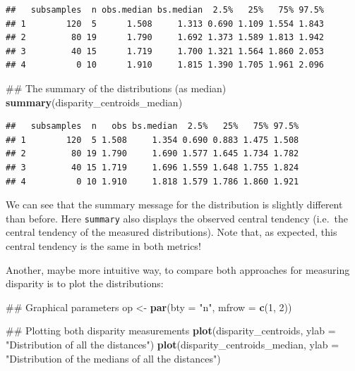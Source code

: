 \documentclass[]{book}
\newenvironment{Shaded}{\begin{snugshade}}{\end{snugshade}}
\newcommand{\KeywordTok}[1]{\textcolor[rgb]{0.13,0.29,0.53}{\textbf{#1}}}
\newcommand{\DataTypeTok}[1]{\textcolor[rgb]{0.13,0.29,0.53}{#1}}
\newcommand{\DecValTok}[1]{\textcolor[rgb]{0.00,0.00,0.81}{#1}}
\newcommand{\StringTok}[1]{\textcolor[rgb]{0.31,0.60,0.02}{#1}}
\newcommand{\NormalTok}[1]{#1}
\theoremstyle{definition}
\theoremstyle{definition}
\theoremstyle{remark}
\begin{document}
\begin{verbatim}
##   subsamples  n obs.median bs.median  2.5%   25%   75% 97.5%
## 1        120  5      1.508     1.313 0.690 1.109 1.554 1.843
## 2         80 19      1.790     1.692 1.373 1.589 1.813 1.942
## 3         40 15      1.719     1.700 1.321 1.564 1.860 2.053
## 4          0 10      1.910     1.815 1.390 1.705 1.961 2.096
\end{verbatim}

\begin{Shaded}
\begin{Highlighting}[]
\NormalTok{## The summary of the distributions (as median)}
\KeywordTok{summary}\NormalTok{(disparity_centroids_median)}
\end{Highlighting}
\end{Shaded}

\begin{verbatim}
##   subsamples  n   obs bs.median  2.5%   25%   75% 97.5%
## 1        120  5 1.508     1.354 0.690 0.883 1.475 1.508
## 2         80 19 1.790     1.690 1.577 1.645 1.734 1.782
## 3         40 15 1.719     1.696 1.559 1.648 1.755 1.824
## 4          0 10 1.910     1.818 1.579 1.786 1.860 1.921
\end{verbatim}

We can see that the summary message for the distribution is slightly
different than before. Here \texttt{summary} also displays the observed
central tendency (i.e.~the central tendency of the measured
distributions). Note that, as expected, this central tendency is the
same in both metrics!

Another, maybe more intuitive way, to compare both approaches for
measuring disparity is to plot the distributions:

\begin{Shaded}
\begin{Highlighting}[]
\NormalTok{## Graphical parameters}
\NormalTok{op <-}\StringTok{ }\KeywordTok{par}\NormalTok{(}\DataTypeTok{bty =} \StringTok{"n"}\NormalTok{, }\DataTypeTok{mfrow =} \KeywordTok{c}\NormalTok{(}\DecValTok{1}\NormalTok{, }\DecValTok{2}\NormalTok{))}

\NormalTok{## Plotting both disparity measurements}
\KeywordTok{plot}\NormalTok{(disparity_centroids, }\DataTypeTok{ylab =} \StringTok{"Distribution of all the distances"}\NormalTok{)}
\KeywordTok{plot}\NormalTok{(disparity_centroids_median,}
     \DataTypeTok{ylab =} \StringTok{"Distribution of the medians of all the distances"}\NormalTok{)}
\end{Highlighting}
\end{Shaded}
\end{document}
